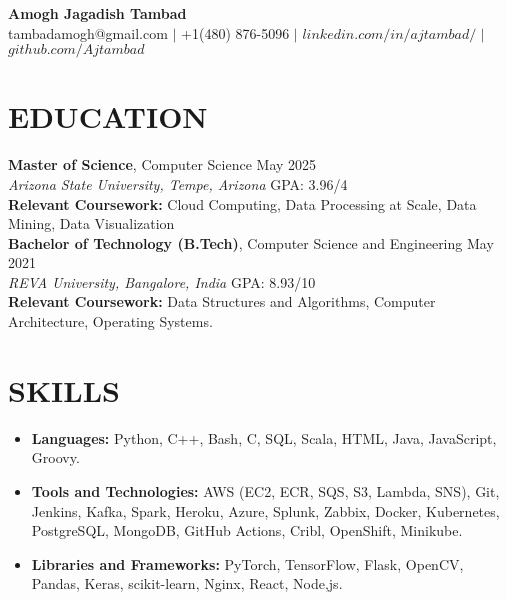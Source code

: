 \documentclass[a4paper,9pt]{extarticle}
\begin{document}
\pagestyle{empty}

\begin{center}
\textbf{\huge Amogh Jagadish Tambad}\\[2pt] %
tambadamogh@gmail.com \hspace{1mm} $|$ \hspace{1mm} +1(480) 876-5096  \hspace{1mm} $|$ \hspace{1mm} $linkedin.com/in/ajtambad/$ \hspace{1mm} $|$ \hspace{1mm} $github.com/Ajtambad$
\end{center}

\section*{EDUCATION}
\noindent
\textbf{Master of Science}, Computer Science \hfill May 2025 \\ %
\textit{Arizona State University, Tempe, Arizona}
\hfill GPA: 3.96/4\\ %
\textbf{Relevant Coursework:} Cloud Computing, Data Processing at Scale, Data Mining, Data Visualization\\

\noindent
\textbf{Bachelor of Technology (B.Tech)}, Computer Science and Engineering \hfill May 2021 \\ %
\textit{REVA University, Bangalore, India}
\hfill GPA: 8.93/10\\ %
\textbf{Relevant Coursework:} Data Structures and Algorithms, Computer Architecture, Operating Systems.

\section*{SKILLS}
\begin{itemize}
    \item \textbf{Languages:} Python, C++, Bash, C, SQL, Scala, HTML, Java, JavaScript, Groovy. %
    \item \textbf{Tools and Technologies:} AWS (EC2, ECR, SQS, S3, Lambda, SNS), Git, Jenkins, Kafka, Spark, Heroku, Azure, Splunk, Zabbix, Docker, Kubernetes, PostgreSQL, MongoDB, GitHub Actions, Cribl, OpenShift, Minikube. %
    \item \textbf{Libraries and Frameworks:} PyTorch, TensorFlow, Flask, OpenCV, Pandas, Keras, scikit-learn, Nginx, React, Node,js.
\end{itemize}
\end{document}
